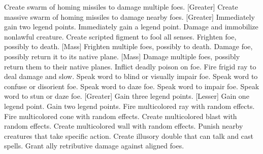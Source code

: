     {Create swarm of homing missiles to damage multiple foes.}
[Greater]
    {Create massive swarm of homing missiles to damage nearby foes.}
[Greater]
    {Immediately gain two legend points.}
    {Immediately gain a legend point.}
    {Damage and immobilize nonlawful creature.}
    {Create scripted figment to fool all senses.}
    {Frighten foe, possibly to death.}
[Mass]
    {Frighten multiple foes, possibly to death.}
    {Damage foe, possibly return it to its native plane.}
[Mass]
    {Damage multiple foes, possibly return them to their native planes.}
    {Inflict deadly poison on foe.}
    {Fire frigid ray to deal damage and slow.}
    {Speak word to blind or visually impair foe.}
    {Speak word to confuse or disorient foe.}
    {Speak word to daze foe.}
    {Speak word to impair foe.}
    {Speak word to stun or daze foe.}
[Greater]
    {Gain three legend points.}
[Lesser]
    {Gain one legend point.}
    {Gain two legend points.}
    {Fire multicolored ray with random effects.}
    {Fire multicolored cone with random effects.}
    {Create multicolored blast with random effects.}
    {Create multicolored wall with random effects.}
    {Punish nearby creatures that take specific action.}
    {Create illusory double that can talk and cast spells.}
    {Grant ally retributive damage against aligned foes.}
